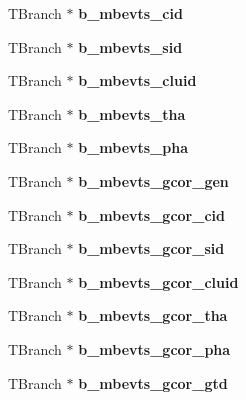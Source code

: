 \begin{DoxyCompactItemize}
T\+Branch $\ast$ {\bfseries b\+\_\+mbevts\+\_\+cid}
\item 
\mbox{\label{classg__clx_a652ba89f8955d64cb10019042407ed66}} 
T\+Branch $\ast$ {\bfseries b\+\_\+mbevts\+\_\+sid}
\item 
\mbox{\label{classg__clx_ad7e1bcca259dbdcee878142a0408c4f2}} 
T\+Branch $\ast$ {\bfseries b\+\_\+mbevts\+\_\+cluid}
\item 
\mbox{\label{classg__clx_a33efe2293f5beedc00bc7ecfafa3adba}} 
T\+Branch $\ast$ {\bfseries b\+\_\+mbevts\+\_\+tha}
\item 
\mbox{\label{classg__clx_af2bd68ab618a4d407ff490d9b59f3af1}} 
T\+Branch $\ast$ {\bfseries b\+\_\+mbevts\+\_\+pha}
\item 
\mbox{\label{classg__clx_a7b323b1e8e119a1df4453be65692ee27}} 
T\+Branch $\ast$ {\bfseries b\+\_\+mbevts\+\_\+gcor\+\_\+gen}
\item 
\mbox{\label{classg__clx_ad7952e19f02fb3638597939d989a2e77}} 
T\+Branch $\ast$ {\bfseries b\+\_\+mbevts\+\_\+gcor\+\_\+cid}
\item 
\mbox{\label{classg__clx_aede01762f6b635d3047dd6f8eff7d566}} 
T\+Branch $\ast$ {\bfseries b\+\_\+mbevts\+\_\+gcor\+\_\+sid}
\item 
\mbox{\label{classg__clx_a8c1be4b1d4bf124c7a95abbeab3bde4e}} 
T\+Branch $\ast$ {\bfseries b\+\_\+mbevts\+\_\+gcor\+\_\+cluid}
\item 
\mbox{\label{classg__clx_a0f7d93d1fa74494fe37cb9ed267ba772}} 
T\+Branch $\ast$ {\bfseries b\+\_\+mbevts\+\_\+gcor\+\_\+tha}
\item 
\mbox{\label{classg__clx_a7a083db76444664d6de969b4d2bc3f4c}} 
T\+Branch $\ast$ {\bfseries b\+\_\+mbevts\+\_\+gcor\+\_\+pha}
\item 
\mbox{\label{classg__clx_ab39c71eb90a3a8d873997427e22e7197}} 
T\+Branch $\ast$ {\bfseries b\+\_\+mbevts\+\_\+gcor\+\_\+gtd}
\item 
\mbox{\label{classg__clx_a04f798d6cf027d59cf944b8c0f09c295}} 

\end{DoxyCompactItemize}
